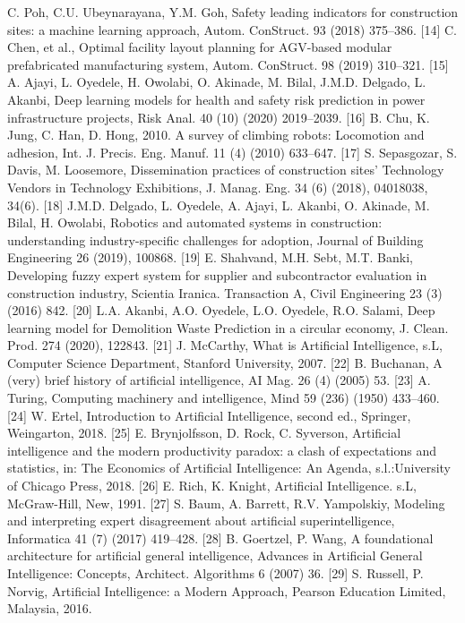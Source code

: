 \documentclass[towcolumn, 11pt]{Article}
\begin{document}
\begin{چکیده}
[13] C. Poh, C.U. Ubeynarayana, Y.M. Goh, Safety leading indicators for construction sites: a machine learning approach, Autom. ConStruct. 93 (2018) 375–386. 
[14] C. Chen, et al., Optimal facility layout planning for AGV-based modular prefabricated manufacturing system, Autom. ConStruct. 98 (2019) 310–321. 
[15] A. Ajayi, L. Oyedele, H. Owolabi, O. Akinade, M. Bilal, J.M.D. Delgado, L. Akanbi, Deep learning models for health and safety risk prediction in power infrastructure projects, Risk Anal. 40 (10) (2020) 2019–2039. 
[16] B. Chu, K. Jung, C. Han, D. Hong, 2010. A survey of climbing robots: Locomotion and adhesion, Int. J. Precis. Eng. Manuf. 11 (4) (2010) 633–647. 
[17] S. Sepasgozar, S. Davis, M. Loosemore, Dissemination practices of construction sites’ Technology Vendors in Technology Exhibitions, J. Manag. Eng. 34 (6) (2018), 04018038, 34(6). 
[18] J.M.D. Delgado, L. Oyedele, A. Ajayi, L. Akanbi, O. Akinade, M. Bilal, H. Owolabi, Robotics and automated systems in construction: understanding industry-specific challenges for adoption, Journal of Building Engineering 26 (2019), 100868. 
[19] E. Shahvand, M.H. Sebt, M.T. Banki, Developing fuzzy expert system for supplier and subcontractor evaluation in construction industry, Scientia Iranica. Transaction A, Civil Engineering 23 (3) (2016) 842. 
[20] L.A. Akanbi, A.O. Oyedele, L.O. Oyedele, R.O. Salami, Deep learning model for Demolition Waste Prediction in a circular economy, J. Clean. Prod. 274 (2020), 122843. 
[21] J. McCarthy, What is Artificial Intelligence, s.L, Computer Science Department, Stanford University, 2007. 
[22] B. Buchanan, A (very) brief history of artificial intelligence, AI Mag. 26 (4) (2005) 53. 
[23] A. Turing, Computing machinery and intelligence, Mind 59 (236) (1950) 433–460. 
[24] W. Ertel, Introduction to Artificial Intelligence, second ed., Springer, Weingarton, 2018. 
[25] E. Brynjolfsson, D. Rock, C. Syverson, Artificial intelligence and the modern productivity paradox: a clash of expectations and statistics, in: The Economics of Artificial Intelligence: An Agenda, s.l.:University of Chicago Press, 2018. 
[26] E. Rich, K. Knight, Artificial Intelligence. s.L, McGraw-Hill, New, 1991. 
[27] S. Baum, A. Barrett, R.V. Yampolskiy, Modeling and interpreting expert disagreement about artificial superintelligence, Informatica 41 (7) (2017) 419–428. 
[28] B. Goertzel, P. Wang, A foundational architecture for artificial general intelligence, Advances in Artificial General Intelligence: Concepts, Architect. Algorithms 6 (2007) 36. 
[29] S. Russell, P. Norvig, Artificial Intelligence: a Modern Approach, Pearson Education Limited, Malaysia, 2016. 

\end{چکیده}
\end{document}
